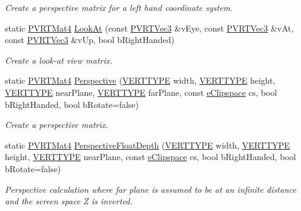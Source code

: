 \begin{DoxyCompactItemize}
\begin{DoxyCompactList}\small\item\em Create a perspective matrix for a left hand coordinate system. \end{DoxyCompactList}\item 
static \hyperlink{struct_p_v_r_t_mat4}{P\+V\+R\+T\+Mat4} \hyperlink{struct_p_v_r_t_mat4_a499e05ac090b56a6c9478b254d68cab5}{Look\+At} (const \hyperlink{struct_p_v_r_t_vec3}{P\+V\+R\+T\+Vec3} \&v\+Eye, const \hyperlink{struct_p_v_r_t_vec3}{P\+V\+R\+T\+Vec3} \&v\+At, const \hyperlink{struct_p_v_r_t_vec3}{P\+V\+R\+T\+Vec3} \&v\+Up, bool b\+Right\+Handed)
\begin{DoxyCompactList}\small\item\em Create a look-\/at view matrix. \end{DoxyCompactList}\item 
static \hyperlink{struct_p_v_r_t_mat4}{P\+V\+R\+T\+Mat4} \hyperlink{struct_p_v_r_t_mat4_af03e5074ed794e142237cd9452f0e054}{Perspective} (\hyperlink{group___a_p_i___o_g_l_e_s_ga06da457b7d3e93368ab904f89e1396be}{V\+E\+R\+T\+T\+Y\+P\+E} width, \hyperlink{group___a_p_i___o_g_l_e_s_ga06da457b7d3e93368ab904f89e1396be}{V\+E\+R\+T\+T\+Y\+P\+E} height, \hyperlink{group___a_p_i___o_g_l_e_s_ga06da457b7d3e93368ab904f89e1396be}{V\+E\+R\+T\+T\+Y\+P\+E} near\+Plane, \hyperlink{group___a_p_i___o_g_l_e_s_ga06da457b7d3e93368ab904f89e1396be}{V\+E\+R\+T\+T\+Y\+P\+E} far\+Plane, const \hyperlink{struct_p_v_r_t_mat4_aad804cddb0d3f6799550aaa703d71e96}{e\+Clipspace} cs, bool b\+Right\+Handed, bool b\+Rotate=false)
\begin{DoxyCompactList}\small\item\em Create a perspective matrix. \end{DoxyCompactList}\item 
static \hyperlink{struct_p_v_r_t_mat4}{P\+V\+R\+T\+Mat4} \hyperlink{struct_p_v_r_t_mat4_a8b8f2f2389bec4038cb2c3fe5aa93ec4}{Perspective\+Float\+Depth} (\hyperlink{group___a_p_i___o_g_l_e_s_ga06da457b7d3e93368ab904f89e1396be}{V\+E\+R\+T\+T\+Y\+P\+E} width, \hyperlink{group___a_p_i___o_g_l_e_s_ga06da457b7d3e93368ab904f89e1396be}{V\+E\+R\+T\+T\+Y\+P\+E} height, \hyperlink{group___a_p_i___o_g_l_e_s_ga06da457b7d3e93368ab904f89e1396be}{V\+E\+R\+T\+T\+Y\+P\+E} near\+Plane, const \hyperlink{struct_p_v_r_t_mat4_aad804cddb0d3f6799550aaa703d71e96}{e\+Clipspace} cs, bool b\+Right\+Handed, bool b\+Rotate=false)
\begin{DoxyCompactList}\small\item\em Perspective calculation where far plane is assumed to be at an infinite distance and the screen space Z is inverted. \end{DoxyCompactList}\item 

\end{DoxyCompactItemize}
